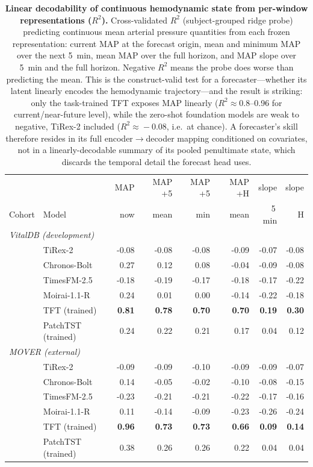 \begin{table}[ht]
\centering\footnotesize
\caption{\textbf{Linear decodability of continuous hemodynamic state from per-window representations ($R^2$).} Cross-validated $R^2$ (subject-grouped ridge probe) predicting continuous mean arterial pressure quantities from each frozen representation: current MAP at the forecast origin, mean and minimum MAP over the next 5~min, mean MAP over the full horizon, and MAP slope over 5~min and the full horizon. Negative $R^2$ means the probe does worse than predicting the mean. This is the construct-valid test for a forecaster---whether its latent linearly encodes the hemodynamic trajectory---and the result is striking: only the task-trained TFT exposes MAP linearly ($R^2\!\approx\!0.8$--0.96 for current/near-future level), while the zero-shot foundation models are weak to negative, TiRex-2 included ($R^2\!\approx\!-0.08$, i.e.\ at chance). A forecaster's skill therefore resides in its full encoder$\rightarrow$decoder mapping conditioned on covariates, not in a linearly-decodable summary of its pooled penultimate state, which discards the temporal detail the forecast head uses.}
\label{tab:probe_traj}
\begin{tabular}{llrrrrrr}
\toprule
& & MAP & MAP +5 & MAP +5 & MAP +H & slope & slope \\
Cohort & Model & now & mean & min & mean & 5\,min & H \\
\midrule
\multicolumn{8}{l}{\textit{VitalDB (development)}}\\
& TiRex-2 & -0.08 & -0.08 & -0.08 & -0.09 & -0.07 & -0.08 \\
& Chronos-Bolt & 0.27 & 0.12 & 0.08 & -0.04 & -0.09 & -0.08 \\
& TimesFM-2.5 & -0.18 & -0.19 & -0.17 & -0.18 & -0.17 & -0.22 \\
& Moirai-1.1-R & 0.24 & 0.01 & 0.00 & -0.14 & -0.22 & -0.18 \\
& TFT (trained) & \textbf{0.81} & \textbf{0.78} & \textbf{0.70} & \textbf{0.70} & \textbf{0.19} & \textbf{0.30} \\
& PatchTST (trained) & 0.24 & 0.22 & 0.21 & 0.17 & 0.04 & 0.12 \\
\midrule
\multicolumn{8}{l}{\textit{MOVER (external)}}\\
& TiRex-2 & -0.09 & -0.09 & -0.10 & -0.09 & -0.09 & -0.07 \\
& Chronos-Bolt & 0.14 & -0.05 & -0.02 & -0.10 & -0.08 & -0.15 \\
& TimesFM-2.5 & -0.23 & -0.21 & -0.21 & -0.22 & -0.17 & -0.16 \\
& Moirai-1.1-R & 0.11 & -0.14 & -0.09 & -0.23 & -0.26 & -0.24 \\
& TFT (trained) & \textbf{0.96} & \textbf{0.73} & \textbf{0.73} & \textbf{0.66} & \textbf{0.09} & \textbf{0.14} \\
& PatchTST (trained) & 0.38 & 0.26 & 0.26 & 0.22 & 0.04 & 0.04 \\
\bottomrule
\end{tabular}
\end{table}

